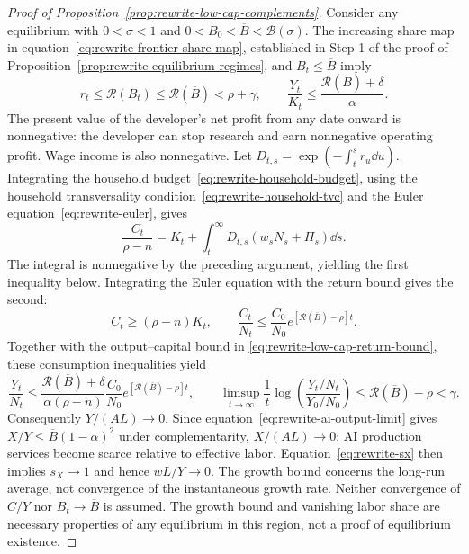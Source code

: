 \begin{proof}[Proof of Proposition~\ref{prop:rewrite-low-cap-complements}]
\label{proof:rewrite-low-cap-complements}
Consider any equilibrium with $0<\sigma<1$ and
$0<B_0<\overline B<\mathcal B(\sigma)$. The increasing share map in
equation~\eqref{eq:rewrite-frontier-share-map}, established in Step 1 of the
proof of Proposition~\ref{prop:rewrite-equilibrium-regimes},
and $B_t\leq\overline B$ imply
\begin{equation}
 r_t\leq\mathcal R(B_t)\leq\mathcal R(\overline B)<\rho+\gamma,
 \qquad
 \frac{Y_t}{K_t}\leq\frac{\mathcal R(\overline B)+\delta}{\alpha}.
 \label{eq:rewrite-low-cap-return-bound}
\end{equation}
The present value of the developer's net profit from any date onward is
nonnegative: the developer can
stop research and earn nonnegative operating profit. Wage income is also
nonnegative. Let $D_{t,s}=\exp(-\int_t^s r_u\dd u)$. Integrating the
household budget~\eqref{eq:rewrite-household-budget}, using the household
transversality condition~\eqref{eq:rewrite-household-tvc} and the Euler
equation~\eqref{eq:rewrite-euler}, gives
\[
 \frac{C_t}{\rho-n}
 =K_t+\int_t^\infty D_{t,s}(w_sN_s+\Pi_s)\dd s.
\]
The integral is nonnegative by the preceding argument, yielding the first
inequality below. Integrating the Euler equation with the return bound
gives the second:
\begin{equation}
 C_t\geq(\rho-n)K_t,
 \qquad
 \frac{C_t}{N_t}\leq\frac{C_0}{N_0}
 e^{[\mathcal R(\overline B)-\rho]t}.
 \label{eq:rewrite-low-cap-consumption-bound}
\end{equation}
Together with the output--capital bound in
\eqref{eq:rewrite-low-cap-return-bound}, these consumption inequalities yield
\begin{equation}
 \frac{Y_t}{N_t}\leq
 \frac{\mathcal R(\overline B)+\delta}{\alpha(\rho-n)}
 \frac{C_0}{N_0}e^{[\mathcal R(\overline B)-\rho]t},
 \qquad
 \limsup_{t\to\infty}\frac1t
 \log\left(\frac{Y_t/N_t}{Y_0/N_0}\right)
 \leq\mathcal R(\overline B)-\rho<\gamma.
 \label{eq:rewrite-low-cap-growth-bound}
\end{equation}
Consequently $Y/(AL)\to0$. Since equation~\eqref{eq:rewrite-ai-output-limit}
gives $X/Y\leq\overline B(1-\alpha)^2$ under complementarity,
$X/(AL)\to0$: AI production services become scarce relative to effective
labor. Equation~\eqref{eq:rewrite-sx} then implies $s_X\to1$ and hence
$wL/Y\to0$.
The growth bound concerns the long-run average, not convergence of the
instantaneous growth rate. Neither convergence of $C/Y$ nor
$B_t\to\overline B$ is assumed. The growth bound and vanishing labor share
are necessary properties of any equilibrium in this region, not a proof of
equilibrium existence.
\end{proof}
